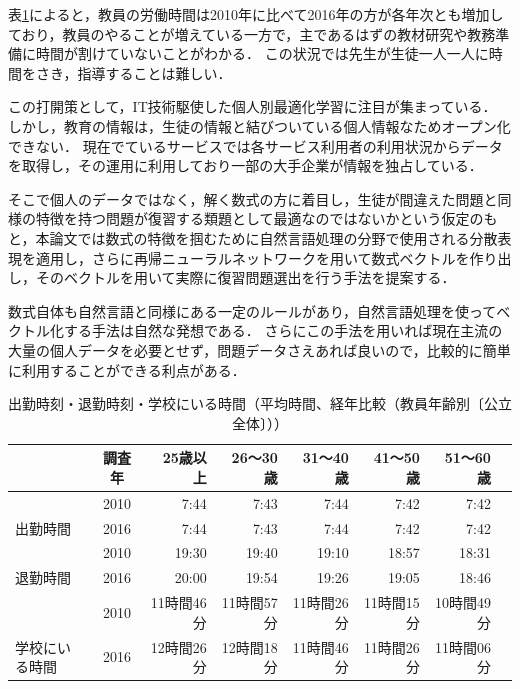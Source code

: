 \documentclass[a4j,11pt,report]{jsbook}
\begin{document}
表\ref{tb:teacher_time}によると，教員の労働時間は2010年に比べて2016年の方が各年次とも増加しており，教員のやることが増えている一方で，主であるはずの教材研究や教務準備に時間が割けていないことがわかる．
この状況では先生が生徒一人一人に時間をさき，指導することは難しい．

この打開策として，IT技術駆使した個人別最適化学習に注目が集まっている．
しかし，教育の情報は，生徒の情報と結びついている個人情報なためオープン化できない．
現在でているサービスでは各サービス利用者の利用状況からデータを取得し，その運用に利用しており一部の大手企業が情報を独占している．

そこで個人のデータではなく，解く数式の方に着目し，生徒が間違えた問題と同様の特徴を持つ問題が復習する類題として最適なのではないかという仮定のもと，本論文では数式の特徴を掴むために自然言語処理の分野で使用される分散表現を適用し，さらに再帰ニューラルネットワークを用いて数式ベクトルを作り出し，そのベクトルを用いて実際に復習問題選出を行う手法を提案する．

数式自体も自然言語と同様にある一定のルールがあり，自然言語処理を使ってベクトル化する手法は自然な発想である．
さらにこの手法を用いれば現在主流の大量の個人データを必要とせず，問題データさえあれば良いので，比較的に簡単に利用することができる利点がある．

\begin{center}
  \begin{table}[t]
    \caption{出勤時刻・退勤時刻・学校にいる時間（平均時間、経年比較（教員年齢別〔公立全体〕））}
    \begingroup
    \begin{tabular}{|l|c|r|r|r|r|r|r|} \hline
      & 調査年 & 25歳以上 & 26〜30歳 & 31〜40歳 & 41〜50歳 & 51〜60歳  \\ \hline \hline
      & 2010 & 7:44 & 7:43 & 7:44 & 7:42 & 7:42 \\ \cline{2-7}
      出勤時間 & 2016 & 7:44 & 7:43 & 7:44 & 7:42 & 7:42 \\ \cline{2-7}\hline
      & 2010 & 19:30 & 19:40 & 19:10 & 18:57 & 18:31 \\ \cline{2-7}
      退勤時間 & 2016 & 20:00 & 19:54 & 19:26 & 19:05 & 18:46 \\ \cline{2-7}\hline
      & 2010 & 11時間46分 & 11時間57分 & 11時間26分 & 11時間15分 & 10時間49分  \\ \cline{2-7}
      学校にいる時間  & 2016 & 12時間26分 & 12時間18分 & 11時間46分 & 11時間26分 & 11時間06分 \\ \cline{2-7}\hline
    \end{tabular}
    \label{tb:teacher_time}
    \endgroup
  \end{table}
\end{center}
\end{document}
